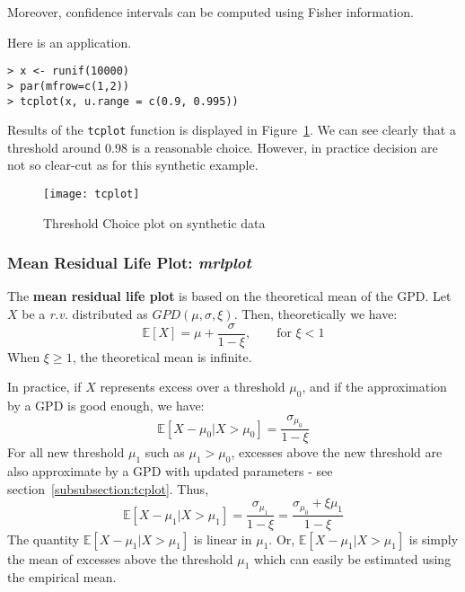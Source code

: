 \documentclass[11pt,a4paper]{article}
\numberwithin{equation}{section}
\theoremstyle{definition}
\begin{document}
Moreover, confidence intervals can be computed using Fisher
information. 

Here is an application.
\begin{verbatim}
> x <- runif(10000)
> par(mfrow=c(1,2))
> tcplot(x, u.range = c(0.9, 0.995))
\end{verbatim}
Results of the \verb+tcplot+ function is displayed in
Figure~\ref{fig:tcplot}. We can see clearly that a threshold around
0.98 is a reasonable choice. However, in practice decision are not so
clear-cut as for this synthetic example.
\begin{figure}
  \centering
  \texttt{[image: tcplot]}
  \caption{Threshold Choice plot on synthetic data}
  \label{fig:tcplot}
\end{figure}

\subsubsection{Mean Residual Life Plot: \emph{mrlplot}}

The \textbf{mean residual life plot} is based on the theoretical mean
of the GPD\@. Let $X$ be a \textit{r.v.} distributed as $GPD(\mu,
\sigma, \xi)$. Then, theoretically we have:
\begin{equation}
  \label{eq:meanGPD}
  \mathbb{E}\left[X \right] = \mu + \frac{\sigma}{1-\xi}, \qquad
  \text{for } \xi < 1
\end{equation}
When $\xi\geq1$, the theoretical mean is infinite.

In practice, if $X$ represents excess over a threshold $\mu_0$, and if
the approximation by a GPD is good enough, we have:
\begin{equation}
  \label{eq:meanExcess}
  \mathbb{E}\left[X - \mu_0 | X > \mu_0 \right] =
  \frac{\sigma_{\mu_0}}{1 - \xi}
\end{equation}
For all new threshold $\mu_1$ such as $\mu_1 > \mu_0$, excesses above
the new threshold are also approximate by a GPD with updated
parameters - see section~\ref{subsubsection:tcplot}. Thus,
\begin{equation}
  \label{eq:meanExcess2}
  \mathbb{E}\left[X - \mu_1 | X > \mu_1 \right] =
  \frac{\sigma_{\mu_1}}{1 - \xi} = \frac{\sigma_{\mu_0} +
    \xi \mu_1}{1 - \xi}
\end{equation}
The quantity $\mathbb{E}\left[X - \mu_1 | X > \mu_1 \right]$ is linear
in $\mu_1$. Or, $\mathbb{E}\left[X - \mu_1 | X > \mu_1 \right]$ is
simply the mean of excesses above the threshold $\mu_1$ which can
easily be estimated using the empirical mean.
\end{document}
